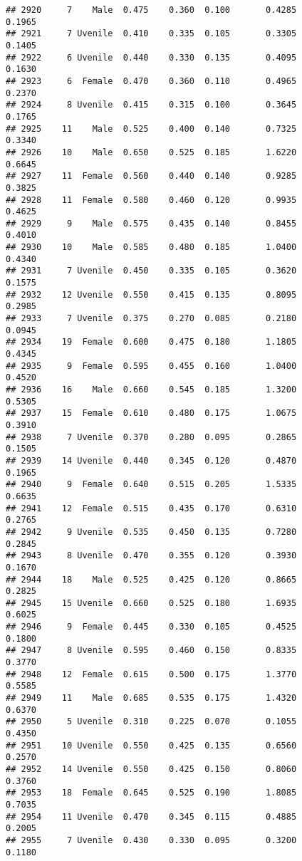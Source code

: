 \documentclass[
]{article}
\begin{document}
\begin{verbatim}
## 2920     7    Male  0.475    0.360  0.100       0.4285         0.1965
## 2921     7 Uvenile  0.410    0.335  0.105       0.3305         0.1405
## 2922     6 Uvenile  0.440    0.330  0.135       0.4095         0.1630
## 2923     6  Female  0.470    0.360  0.110       0.4965         0.2370
## 2924     8 Uvenile  0.415    0.315  0.100       0.3645         0.1765
## 2925    11    Male  0.525    0.400  0.140       0.7325         0.3340
## 2926    10    Male  0.650    0.525  0.185       1.6220         0.6645
## 2927    11  Female  0.560    0.440  0.140       0.9285         0.3825
## 2928    11  Female  0.580    0.460  0.120       0.9935         0.4625
## 2929     9    Male  0.575    0.435  0.140       0.8455         0.4010
## 2930    10    Male  0.585    0.480  0.185       1.0400         0.4340
## 2931     7 Uvenile  0.450    0.335  0.105       0.3620         0.1575
## 2932    12 Uvenile  0.550    0.415  0.135       0.8095         0.2985
## 2933     7 Uvenile  0.375    0.270  0.085       0.2180         0.0945
## 2934    19  Female  0.600    0.475  0.180       1.1805         0.4345
## 2935     9  Female  0.595    0.455  0.160       1.0400         0.4520
## 2936    16    Male  0.660    0.545  0.185       1.3200         0.5305
## 2937    15  Female  0.610    0.480  0.175       1.0675         0.3910
## 2938     7 Uvenile  0.370    0.280  0.095       0.2865         0.1505
## 2939    14 Uvenile  0.440    0.345  0.120       0.4870         0.1965
## 2940     9  Female  0.640    0.515  0.205       1.5335         0.6635
## 2941    12  Female  0.515    0.435  0.170       0.6310         0.2765
## 2942     9 Uvenile  0.535    0.450  0.135       0.7280         0.2845
## 2943     8 Uvenile  0.470    0.355  0.120       0.3930         0.1670
## 2944    18    Male  0.525    0.425  0.120       0.8665         0.2825
## 2945    15 Uvenile  0.660    0.525  0.180       1.6935         0.6025
## 2946     9  Female  0.445    0.330  0.105       0.4525         0.1800
## 2947     8 Uvenile  0.595    0.460  0.150       0.8335         0.3770
## 2948    12  Female  0.615    0.500  0.175       1.3770         0.5585
## 2949    11    Male  0.685    0.535  0.175       1.4320         0.6370
## 2950     5 Uvenile  0.310    0.225  0.070       0.1055         0.4350
## 2951    10 Uvenile  0.550    0.425  0.135       0.6560         0.2570
## 2952    14 Uvenile  0.550    0.425  0.150       0.8060         0.3760
## 2953    18  Female  0.645    0.525  0.190       1.8085         0.7035
## 2954    11 Uvenile  0.470    0.345  0.115       0.4885         0.2005
## 2955     7 Uvenile  0.430    0.330  0.095       0.3200         0.1180

\end{verbatim}
\end{document}
